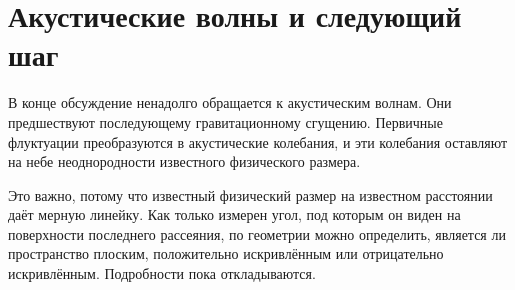 \section{Акустические волны и следующий шаг}

В конце обсуждение ненадолго обращается к акустическим волнам. Они предшествуют последующему гравитационному сгущению. Первичные флуктуации преобразуются в акустические колебания, и эти колебания оставляют на небе неоднородности известного физического размера.

Это важно, потому что известный физический размер на известном расстоянии даёт мерную линейку. Как только измерен угол, под которым он виден на поверхности последнего рассеяния, по геометрии можно определить, является ли пространство плоским, положительно искривлённым или отрицательно искривлённым. Подробности пока откладываются.

\begin{classroomqa}
\end{classroomqa}
